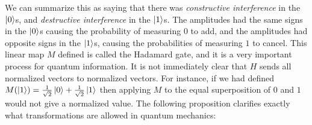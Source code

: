 \documentclass{article}
\theoremstyle{definition}
\numberwithin{figure}{section}
\begin{document}
We can summarize this as saying that there was \textit{constructive interference} in the $\left|0\right>$s, and \textit{destructive interference} in the $\left|1\right>$s. The amplitudes had the same signs in the $\left|0\right>$s causing the probability of measuring $0$ to add, and the amplitudes had opposite signs in the $\left|1\right>$s, causing the probabilities of measuring $1$ to cancel. This linear map $M$ defined is called the Hadamard gate, and it is a very important process for quantum information. It is not immediately clear that $H$ sends all normalized vectors to normalized vectors. For instance, if we had defined $M(\left|1\right>)=\frac{1}{\sqrt{2}}\left|0\right>+\frac{1}{\sqrt{2}}\left|1\right>$ then applying $M$ to the equal superposition of $0$ and $1$ would not give a normalized value. The following proposition clarifies exactly what transformations are allowed in quantum mechanics:
\end{document}
